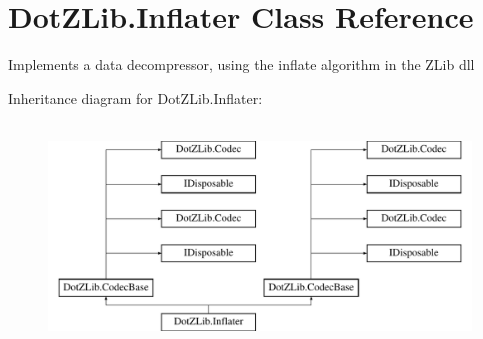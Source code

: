 \hypertarget{class_dot_z_lib_1_1_inflater}{}\section{Dot\+Z\+Lib.\+Inflater Class Reference}
\label{class_dot_z_lib_1_1_inflater}


Implements a data decompressor, using the inflate algorithm in the Z\+Lib dll  


Inheritance diagram for Dot\+Z\+Lib.\+Inflater\+:\begin{figure}[H]
\begin{center}
\leavevmode
\includegraphics[height=6.000000cm]{class_dot_z_lib_1_1_inflater}
\end{center}
\end{figure}
